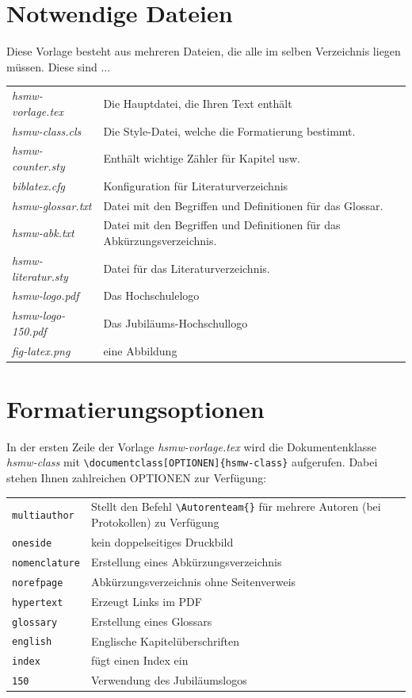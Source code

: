 \documentclass[nomenclature, norefpage, oneside, glossary, hypertext,multiauthor]{hsmw-class}
\begin{document}
\section{Notwendige Dateien}
Diese Vorlage besteht aus mehreren Dateien, die alle im selben Verzeichnis liegen müssen. Diese sind ...

\begin{tabular}{lp{}}
\textit{hsmw-vorlage.tex} & Die Hauptdatei, die Ihren Text enthält \\
\textit{hsmw-class.cls} & Die Style-Datei, welche die Formatierung bestimmt.\\
\textit{hsmw-counter.sty} & Enthält wichtige Zähler für Kapitel usw.\\
\textit{biblatex.cfg} & Konfiguration für Literaturverzeichnis\\
\textit{hsmw-glossar.txt} & Datei mit den Begriffen und Definitionen für das Glossar.\\
\textit{hsmw-abk.txt} & Datei mit den Begriffen und Definitionen für das Abkürzungsverzeichnis.\\
\textit{hsmw-literatur.sty} & Datei für das Literaturverzeichnis.\\
\textit{hsmw-logo.pdf} & Das Hochschulelogo\\
\textit{hsmw-logo-150.pdf} & Das Jubiläums-Hochschullogo\\
\textit{fig-latex.png} & eine Abbildung\\
\end{tabular}

\section{Formatierungsoptionen}
In der ersten Zeile der Vorlage \textit{hsmw-vorlage.tex} wird die Dokumentenklasse \textit{hsmw-class}  mit \verb+\documentclass[OPTIONEN]{hsmw-class}+ aufgerufen. Dabei stehen Ihnen zahlreichen OPTIONEN zur Verfügung:

\begin{tabular}{lp{}}
\texttt{multiauthor} & Stellt den Befehl \verb+\Autorenteam{}+ für mehrere Autoren (bei Protokollen) zu Verfügung \\
\texttt{oneside} & kein doppelseitiges Druckbild \\
\texttt{nomenclature} & Erstellung eines Abkürzungsverzeichnis \\
\texttt{norefpage} & Abkürzungsverzeichnis ohne Seitenverweis \\
\texttt{hypertext} & Erzeugt Links im PDF \\
\texttt{glossary} & Erstellung eines Glossars \\
\texttt{english} & Englische Kapitelüberschriften \\
\texttt{index} & fügt einen Index ein \\
\texttt{150} & Verwendung des Jubiläumslogos \\
\end{tabular}
\end{document}
